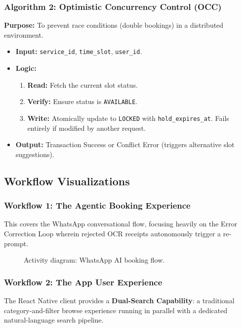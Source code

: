 \subsubsection{Algorithm 2: Optimistic Concurrency Control (OCC)}
\textbf{Purpose:} To prevent race conditions (double bookings) in a distributed environment.
\begin{itemize}
    \item \textbf{Input:} \texttt{service\_id}, \texttt{time\_slot}, \texttt{user\_id}.
    \item \textbf{Logic:}
    \begin{enumerate}
        \item \textbf{Read:} Fetch the current slot status.
        \item \textbf{Verify:} Ensure status is \texttt{AVAILABLE}.
        \item \textbf{Write:} Atomically update to \texttt{LOCKED} with \texttt{hold\_expires\_at}. Fails entirely if modified by another request.
    \end{enumerate}
    \item \textbf{Output:} Transaction Success or Conflict Error (triggers alternative slot suggestions).
\end{itemize}

\subsection{Workflow Visualizations}
\FloatBarrier

\Needspace{0.82\textheight}
\subsubsection{Workflow 1: The Agentic Booking Experience}
This covers the WhatsApp conversational flow, focusing heavily on the Error Correction Loop wherein rejected OCR receipts autonomously trigger a re-prompt.
\begin{figure}[H]
    \centering
    \caption{Activity diagram: WhatsApp AI booking flow.}
    \label{fig:sds-wa-flow}
\end{figure}

\FloatBarrier
\Needspace{0.82\textheight}
\subsubsection{Workflow 2: The App User Experience}
The React Native client provides a \textbf{Dual-Search Capability}: a traditional category-and-filter browse experience running in parallel with a dedicated natural-language search pipeline.

